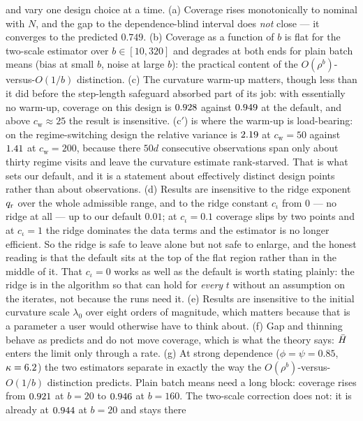\RefAblFig{} and  vary one design choice at a time.
(a) Coverage rises monotonically to nominal with $N$, and the gap to the dependence-blind
interval does \emph{not} close --- it converges to the predicted $0.749$.
(b) Coverage as a function of $b$ is flat for the two-scale estimator over
$b\in[10,320]$ and degrades at both ends for plain batch means (bias at small $b$, noise at
large $b$): the practical content of the $O(\rho^{b})$-versus-$O(1/b)$ distinction.
(c) The curvature warm-up matters, though less than it did before the step-length safeguard
absorbed part of its job: with essentially no warm-up, coverage on this design is
$0.928$ against $0.949$ at the default, and above $c_{\mathrm w}\approx25$ the
result is insensitive. (c$'$) is where the warm-up is load-bearing: on the regime-switching
design the relative variance is $2.19$ at $c_{\mathrm w}=50$ against
$1.41$ at $c_{\mathrm w}=200$, because there $50d$ consecutive observations span
only about thirty regime visits and leave the curvature estimate rank-starved. That is what sets
our default, and it is a statement about effectively distinct design points rather than about
observations.
(d) Results are insensitive to the ridge exponent $q_{\mathrm r}$ over the whole admissible range, and to
the ridge constant $c_\iota$ from $0$ --- no ridge at all --- up to our default $0.01$; at
$c_\iota=0.1$ coverage slips by two points and at $c_\iota=1$ the ridge dominates the data terms
and the estimator is no longer efficient. So the ridge is safe to leave alone but not safe to
enlarge, and the honest reading is that the default sits at the top of the flat region rather than
in the middle of it. That $c_\iota=0$ works as well as the default is worth stating plainly: the
ridge is in the algorithm so that  can hold for \emph{every} $t$ without an
assumption on the iterates, not because the runs need it.
(e) Results are insensitive to the initial curvature scale $\lambda_0$ over eight orders of
magnitude, which matters because that is a parameter a user would otherwise have to think about.
(f) Gap and thinning behave as  predicts and do not move coverage, which is
what the theory says: $\bar{H}$ enters the limit only through a rate.
(g) At strong dependence ($\phi=\psi=0.85$, $\kappa=6.2$) the two estimators separate in
exactly the way the $O(\rho^b)$-versus-$O(1/b)$ distinction predicts. Plain batch means need a
long block: coverage rises from $0.921$ at $b=20$ to $0.946$ at $b=160$.
The two-scale correction does not: it is already at $0.944$ at $b=20$ and stays there
